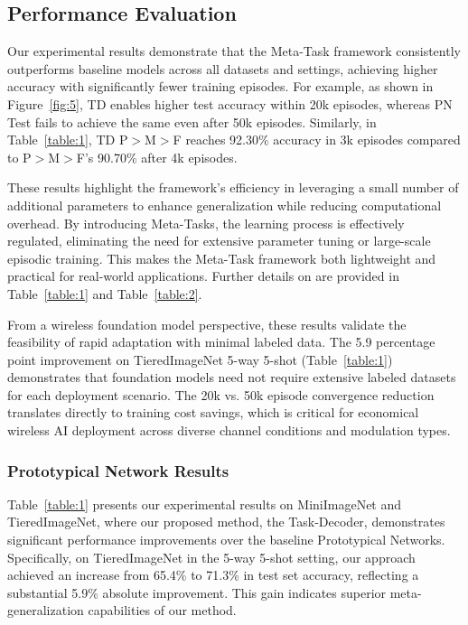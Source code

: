 \subsection{Performance Evaluation}
{\color{black} 
Our experimental results demonstrate that the Meta-Task framework consistently outperforms baseline models across all datasets and settings, achieving higher accuracy with significantly fewer training episodes. For example, as shown in Figure~\ref{fig:5}, TD enables higher test accuracy within 20k episodes, whereas PN Test fails to achieve the same even after 50k episodes. Similarly, in Table~\ref{table:1}, TD P$>$M$>$F reaches 92.30\% accuracy in 3k episodes compared to P$>$M$>$F's 90.70\% after 4k episodes.

These results highlight the framework's efficiency in leveraging a small number of additional parameters to enhance generalization while reducing computational overhead. By introducing Meta-Tasks, the learning process is effectively regulated, eliminating the need for extensive parameter tuning or large-scale episodic training. This makes the Meta-Task framework both lightweight and practical for real-world applications. Further details on are provided in Table~\ref{table:1} and Table~\ref{table:2}.

From a wireless foundation model perspective, these results validate the feasibility of rapid adaptation with minimal labeled data. The 5.9 percentage point improvement on TieredImageNet 5-way 5-shot (Table~\ref{table:1}) demonstrates that foundation models need not require extensive labeled datasets for each deployment scenario. The 20k vs. 50k episode convergence reduction translates directly to training cost savings, which is critical for economical wireless AI deployment across diverse channel conditions and modulation types.
}

\subsubsection*{Prototypical Network Results}
Table~\ref{table:1} presents our experimental results on MiniImageNet and TieredImageNet, where our proposed method, the Task-Decoder, demonstrates significant performance improvements over the baseline Prototypical Networks. Specifically, on TieredImageNet in the 5-way 5-shot setting, our approach achieved an increase from 65.4\% to 71.3\% in test set accuracy, reflecting a substantial 5.9\% absolute improvement. This gain indicates superior meta-generalization capabilities of our method.

